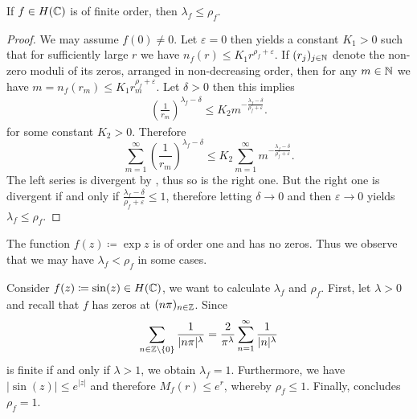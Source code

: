 \begin{theorem} \label{thm:inequality-order-exponent-of-convergence}
    If $f \in H(\mathbb{C})$ is of finite order, then $\lambda_f \leq \rho_f$.
\end{theorem}

\begin{proof}
    We may assume $f(0) \neq 0$. Let $\varepsilon = 0$ then  yields a constant $K_1 > 0$ such that for sufficiently large $r$ we have $n_f(r) \leq K_1 r^{\rho_f + \varepsilon}$. If $(r_j)_{j \in \mathbb{N}}$ denote the non-zero moduli of its zeros, arranged in non-decreasing order, then for any $m \in \mathbb{N}$ we have $m = n_f(r_m) \leq K_1 r_m^{\rho_f + \varepsilon}$. Let $\delta > 0$ then this implies
    \begin{align*}
        \left( \frac{1}{r_m} \right)^{\lambda_f - \delta} \leq K_2 m^{- \frac{\lambda_f - \delta}{\rho_f + \varepsilon}}.
    \end{align*}
    for some constant $K_2 > 0$. Therefore
    \begin{equation*}
        \sum_{m=1}^\infty \left( \frac{1}{r_m} \right)^{\lambda_f - \delta} \leq K_2 \sum_{m=1}^\infty m^{- \frac{\lambda_f - \delta}{\rho_f + \varepsilon}}.
    \end{equation*}
    The left series is divergent by , thus so is the right one. But the right one is divergent if and only if $\frac{\lambda_f - \delta}{\rho_f + \varepsilon} \leq 1$, therefore letting $\delta \to 0$ and then $\varepsilon \to 0$ yields $\lambda_f \leq \rho_f$.
\end{proof}

\begin{remark}
    The function $f(z) \coloneqq \exp z$ is of order one and has no zeros. Thus we observe that we may have $\lambda_f < \rho_f$ in some cases.
\end{remark}

\begin{example} \label{exm:exponent-of-convergence}
    Consider $f(z) \coloneqq \sin(z) \in H(\mathbb{C})$, we want to calculate $\lambda_f$ and $\rho_f$. First, let $\lambda > 0$ and recall that $f$ has zeros at $(n \pi)_{n \in \mathbb{Z}}$. Since
    $$ \sum_{n \in \mathbb{Z} \setminus \{0\}} \frac{1}{\vert n \pi \vert^\lambda} = \frac{2}{\pi^\lambda} \sum_{n=1}^\infty \frac{1}{\vert n \vert^\lambda} $$
    is finite if and only if $\lambda > 1$, we obtain $\lambda_f = 1$. Furthermore, we have $\vert \sin(z) \vert \leq e^{\vert z \vert}$
    and therefore $M_f(r) \leq e^r$, whereby $\rho_f \leq 1$. Finally,  concludes $\rho_f = 1$.
\end{example}

